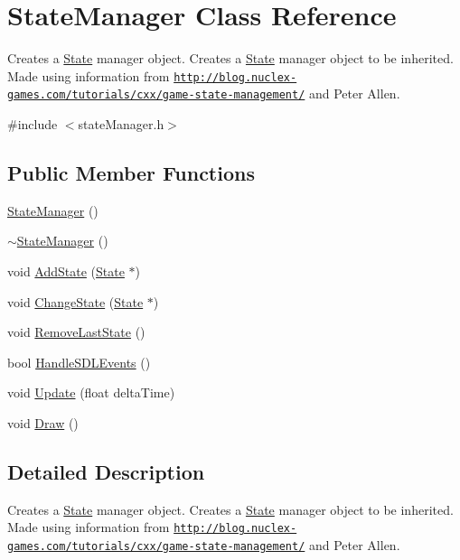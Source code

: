 \hypertarget{class_state_manager}{\section{State\+Manager Class Reference}
\label{class_state_manager}
}


Creates a \hyperlink{class_state}{State} manager object. Creates a \hyperlink{class_state}{State} manager object to be inherited. Made using information from \href{http://blog.nuclex-games.com/tutorials/cxx/game-state-management/}{\tt http\+://blog.\+nuclex-\/games.\+com/tutorials/cxx/game-\/state-\/management/} and Peter Allen.  




{\ttfamily \#include $<$state\+Manager.\+h$>$}

\subsection*{Public Member Functions}
\begin{DoxyCompactItemize}
\item 
\hyperlink{class_state_manager_a3e2be96d935eb56813b096a885d58587}{State\+Manager} ()
\item 
\hyperlink{class_state_manager_a05a43504a033f1befad5c5118249ec6f}{$\sim$\+State\+Manager} ()
\item 
void \hyperlink{class_state_manager_aa925e9a15bba3cc4b262a08c8024ea3b}{Add\+State} (\hyperlink{class_state}{State} $\ast$)
\item 
void \hyperlink{class_state_manager_a8c14290973150a37afdf365d00ffcbba}{Change\+State} (\hyperlink{class_state}{State} $\ast$)
\item 
void \hyperlink{class_state_manager_ac782f24f5c02c27169bc2b3bf7aa3d41}{Remove\+Last\+State} ()
\item 
bool \hyperlink{class_state_manager_a10042662c52179ea1ad85051562ca4bf}{Handle\+S\+D\+L\+Events} ()
\item 
void \hyperlink{class_state_manager_a0b430dbaff295c0f96d365da8113fd31}{Update} (float delta\+Time)
\item 
void \hyperlink{class_state_manager_a2827f9e10336c53c7957ed5c09cb2a49}{Draw} ()
\end{DoxyCompactItemize}


\subsection{Detailed Description}
Creates a \hyperlink{class_state}{State} manager object. Creates a \hyperlink{class_state}{State} manager object to be inherited. Made using information from \href{http://blog.nuclex-games.com/tutorials/cxx/game-state-management/}{\tt http\+://blog.\+nuclex-\/games.\+com/tutorials/cxx/game-\/state-\/management/} and Peter Allen. 

